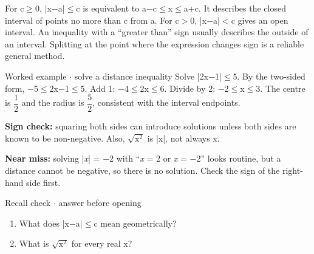 \documentclass[11pt]{article}
\begin{document}
\begin{keepsection}
For c\ensuremath{\geq}0, |x\ensuremath{-}a|\ensuremath{\leq}c is equivalent to a\ensuremath{-}c\ensuremath{\leq}x\ensuremath{\leq}a+c. It describes the closed interval of points no more than c from a. For c\ensuremath{>}0, |x\ensuremath{-}a|\ensuremath{<}c gives an open interval. An inequality with a “greater than” sign usually describes the outside of an interval. Splitting at the point where the expression changes sign is a reliable general method.

\begin{workedbox}{Worked example \ensuremath{\cdot} solve a distance inequality}
Solve |2x\ensuremath{-}1|\ensuremath{\leq}5. By the two-sided form, \ensuremath{-}5\ensuremath{\leq}2x\ensuremath{-}1\ensuremath{\leq}5. Add 1: \ensuremath{-}4\ensuremath{\leq}2x\ensuremath{\leq}6. Divide by 2: \ensuremath{-}2\ensuremath{\leq}x\ensuremath{\leq}3. The centre is {\small\ensuremath{\dfrac{1}{2}}} and the radius is {\small\ensuremath{\dfrac{5}{2}}}, consistent with the interval endpoints.
\end{workedbox}

\begin{notebox}\textbf{Sign check:} squaring both sides can introduce solutions unless both sides are known to be non-negative. Also, \ensuremath{\sqrt{\mathrm{x}^{2}}} is |x|, not always x.\end{notebox}

\begin{notebox}\textbf{Near miss:} solving |\textit{x}| = \ensuremath{-}2 with “\textit{x} = 2 or \textit{x} = \ensuremath{-}2” looks routine, but a distance cannot be negative, so there is no solution. Check the sign of the right-hand side first.\end{notebox}

\begin{recallbox}{Recall check \ensuremath{\cdot} answer before opening}
\begin{enumerate}
\item What does |x\ensuremath{-}a|\ensuremath{\leq}c mean geometrically?
\item What is \ensuremath{\sqrt{\mathrm{x}^{2}}} for every real x?
\end{enumerate}

\end{recallbox}
\end{keepsection}
\end{document}
